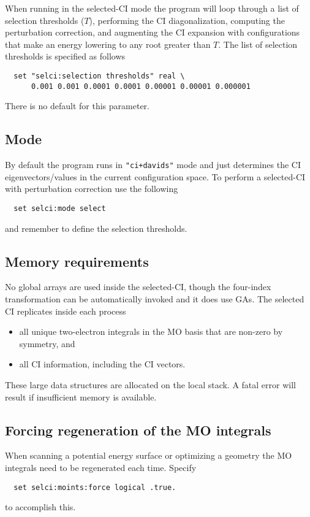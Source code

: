 When running in the selected-CI mode the program will loop
through a list of selection thresholds ($T$), performing the CI
diagonalization, computing the perturbation correction, and augmenting
the CI expansion with configurations that make an energy lowering to
any root greater than $T$.  The list of selection thresholds is
specified as follows
\begin{verbatim}
  set "selci:selection thresholds" real \
      0.001 0.001 0.0001 0.0001 0.00001 0.00001 0.000001
\end{verbatim}

There is no default for this parameter.


\subsection{Mode}

By default the program runs in \verb="ci+davids"= mode and just
determines the CI eigenvectors/values in the current configuration
space.  To perform a selected-CI with perturbation correction use the
following
\begin{verbatim}
  set selci:mode select
\end{verbatim}
and remember to define the selection thresholds.

\subsection{Memory requirements}

No global arrays are used inside the selected-CI, though the
four-index transformation can be automatically invoked and it does use
GAs.  The selected CI replicates inside each process
\begin{itemize}
\item all unique two-electron integrals in the MO basis that are
  non-zero by symmetry, and
\item all CI information, including the CI vectors.
\end{itemize}
These large data structures are allocated on the local stack.  A fatal
error will result if insufficient memory is available.

\subsection{Forcing regeneration of the MO integrals}

When scanning a potential energy surface or optimizing a geometry the
MO integrals need to be regenerated each time.  Specify
\begin{verbatim}
  set selci:moints:force logical .true.
\end{verbatim}
to accomplish this.

